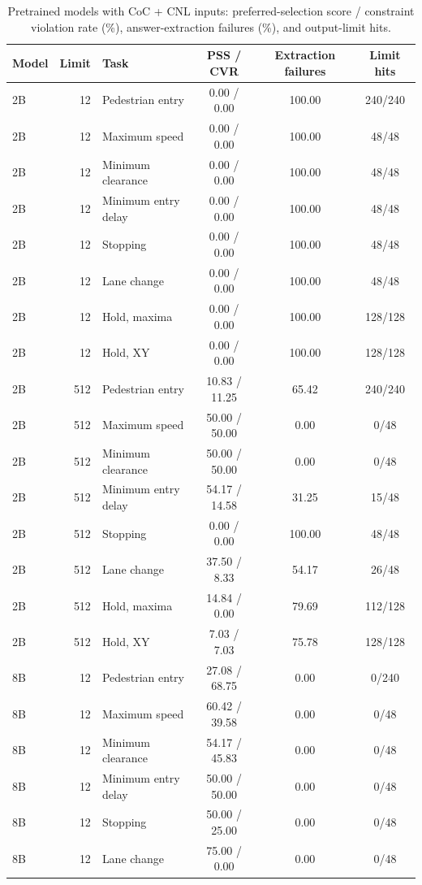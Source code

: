 \documentclass[10pt]{article}
\begin{document}
\begin{table}[h]
\centering\footnotesize
\caption{Pretrained models with CoC + CNL inputs: preferred-selection score / constraint violation rate (\%), answer-extraction failures (\%), and output-limit hits.}
\label{tab:sup-pretrained}
\begin{tabular}{lrlccc}
\toprule
Model & Limit & Task & PSS / CVR & Extraction failures & Limit hits\\
\midrule
2B & 12 & Pedestrian entry & 0.00 / 0.00 & 100.00 & 240/240\\
2B & 12 & Maximum speed & 0.00 / 0.00 & 100.00 & 48/48\\
2B & 12 & Minimum clearance & 0.00 / 0.00 & 100.00 & 48/48\\
2B & 12 & Minimum entry delay & 0.00 / 0.00 & 100.00 & 48/48\\
2B & 12 & Stopping & 0.00 / 0.00 & 100.00 & 48/48\\
2B & 12 & Lane change & 0.00 / 0.00 & 100.00 & 48/48\\
2B & 12 & Hold, maxima & 0.00 / 0.00 & 100.00 & 128/128\\
2B & 12 & Hold, XY & 0.00 / 0.00 & 100.00 & 128/128\\
2B & 512 & Pedestrian entry & 10.83 / 11.25 & 65.42 & 240/240\\
2B & 512 & Maximum speed & 50.00 / 50.00 & 0.00 & 0/48\\
2B & 512 & Minimum clearance & 50.00 / 50.00 & 0.00 & 0/48\\
2B & 512 & Minimum entry delay & 54.17 / 14.58 & 31.25 & 15/48\\
2B & 512 & Stopping & 0.00 / 0.00 & 100.00 & 48/48\\
2B & 512 & Lane change & 37.50 / 8.33 & 54.17 & 26/48\\
2B & 512 & Hold, maxima & 14.84 / 0.00 & 79.69 & 112/128\\
2B & 512 & Hold, XY & 7.03 / 7.03 & 75.78 & 128/128\\
8B & 12 & Pedestrian entry & 27.08 / 68.75 & 0.00 & 0/240\\
8B & 12 & Maximum speed & 60.42 / 39.58 & 0.00 & 0/48\\
8B & 12 & Minimum clearance & 54.17 / 45.83 & 0.00 & 0/48\\
8B & 12 & Minimum entry delay & 50.00 / 50.00 & 0.00 & 0/48\\
8B & 12 & Stopping & 50.00 / 25.00 & 0.00 & 0/48\\
8B & 12 & Lane change & 75.00 / 0.00 & 0.00 & 0/48\\

\end{tabular}
\end{table}
\end{document}

